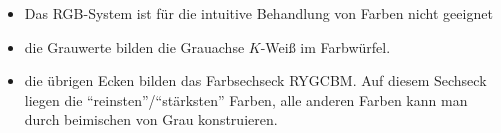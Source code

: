 \begin{itemize}
 \item Das RGB-System ist für die intuitive Behandlung von Farben nicht geeignet
 \item die Grauwerte bilden die Grauachse $K$-Weiß im Farbwürfel.
 \item die übrigen Ecken bilden das Farbsechseck RYGCBM. Auf diesem Sechseck liegen die "`reinsten"'/"`stärksten"'
	Farben, alle anderen Farben kann man durch beimischen von Grau konstruieren.
\end{itemize}
